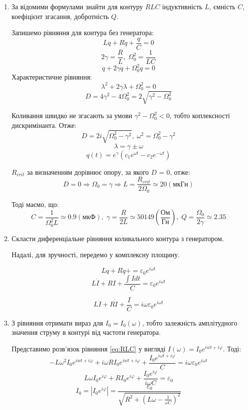 \documentclass[a4paper, 12pt]{article}
\begin{document}
\begin{enumerate}
    \item За відомими формулами знайти для контуру $RLC$ індуктивність $L$, 
    ємність $C$, коефіцієнт згасання, добротність $Q$.
    
    Запишемо рівняння для контура без генератора:
    $$ L\ddot{q} + R\dot{q} + \frac{q}{C} = 0 $$
    $$ 2\gamma = \frac{R}{L}, \; \Omega_0^2 = \frac{1}{LC} $$
    $$ \ddot{q} +  2\gamma \dot{q} + \Omega_0^2 q = 0 $$
    Характеристичне рівняння:
    $$ \lambda^2 + 2 \gamma \lambda + \Omega_0^2 = 0 $$
    $$ D = 4 \gamma^2 - 4 \Omega_0^2 = 2 \sqrt{\gamma^2 - \Omega_0^2}$$

    Коливання швидко не згасають за умови $\gamma^2 - \Omega_0^2 < 0$, 
    тобто коплексності дискримінанта. Отже:
    $$ D = 2i\sqrt{\Omega_0^2 - \gamma^2}, \; \omega^2 = {\Omega_0^2 - \gamma^2}$$
    $$ \lambda = \gamma \pm \omega $$
    $$ q(t) = e^{\gamma} \left( c_1 e^{\omega t} - c_2 e^{-\omega t} \right) $$

    $R_{crit}$ за визначенням дорівнює опору, за якого $D$ = 0, отже:
    $$D = 0 \Rightarrow \Omega_0 = \gamma 
    \Rightarrow L = \frac{R_{crit}}{2 \Omega_0} \simeq 20 (мкГн)$$
    
    Тоді маємо, що:
    $$ C = \frac{1}{\Omega_0^2 L} \simeq 0.9 (мкФ),\; 
    \gamma = \frac{R}{2L} \simeq 50149 (\frac{Ом}{Гн}),\; 
    Q = \frac{\Omega_0}{2 \gamma} \simeq 2.35$$

    \item Скласти диференціальне рівняння коливального контура з генератором.
    
    Надалі, для зручності, передемо у комплексну площину.

    $$ L\ddot{q} + R\dot{q} +  = \varepsilon_0 e^{i \omega t} $$
    $$ L\dot{I} +  RI + \frac{\int I dt}{C} = \varepsilon_0 e^{i \omega t} $$

    \begin{equation} \label{eq:RLC}
        L\ddot{I} +  R\dot{I} + \frac{I}{C} = i \omega \varepsilon_0 e^{i \omega t}
    \end{equation}    

    \item З рівняння отримати вираз для $I_0=I_0(\omega)$, тобто залежність
    амплітудного значення струму в контурі від частоти генератора.

    Представимо розв'язок рівняння \ref{eq:RLC} у вигляді $I(\omega) = I_0 e^{iwt+i\varphi}$. Тоді:
    $$ -L \omega^2 I_0 e^{iwt + i \varphi} + i \omega R I_0 e^{iwt + i \varphi} + \frac{I_0 e^{i \omega t + i \varphi}}{C} = i \omega \varepsilon_0 e^{i \omega t} $$
    $$ L \omega I_0 e^{i \varphi} + R I_0 e^{i \varphi} + \frac{I_0 e^{i\varphi}}{i \omega C} = \varepsilon_0 $$
    $$ I_0 = |I_0 e^{i \varphi}| = \frac{\varepsilon_0}{\sqrt{R^2 + \left( L \omega - \frac{1}{\omega C} \right)^2}} $$


\end{enumerate}
\end{document}
